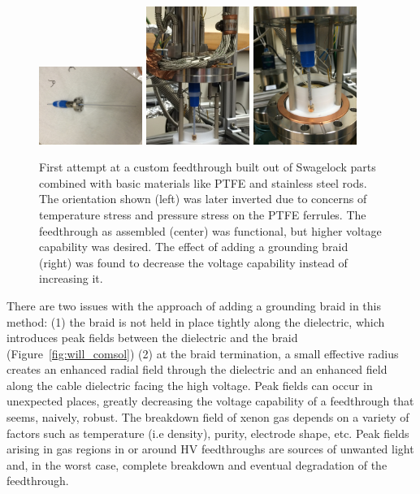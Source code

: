 \begin{figure}[htbp]
\begin{center}
\includegraphics[width=0.3\textwidth, angle=-90]{figures/testbed/ft4_1.jpg}
\includegraphics[width=0.3\textwidth, angle=-90]{figures/testbed/ft4_2.jpg}
\includegraphics[width=0.3\textwidth, angle=-90]{figures/testbed/ft4_3.jpg}

\caption{First attempt at a custom feedthrough built out of Swagelock parts combined with basic materials like \acs{PTFE} and stainless steel rods. The orientation shown (left) was later inverted due to concerns of temperature stress and pressure stress on the \acs{PTFE} ferrules. The feedthrough as assembled (center) was functional, but higher voltage capability was desired. The effect of adding a grounding braid (right) was found to decrease the voltage capability instead of increasing it.  }
\label{fig:ft4}
\end{center}
\end{figure}


There are two issues with the approach of adding a grounding braid in this method: (1) the braid is not held in place tightly along the dielectric, which introduces peak fields between the dielectric and the braid (Figure~\ref{fig:will_comsol}) (2) at the braid termination, a small effective radius creates an enhanced radial field through the  dielectric and an enhanced field along the cable dielectric facing the high voltage. Peak fields can occur in unexpected places, greatly decreasing the voltage capability of a feedthrough that seems, naively, robust. The breakdown field of xenon gas depends on a variety of factors such as temperature (i.e density), purity, electrode shape, etc. Peak fields arising in gas regions in or around \ac{HV} feedthroughs are sources of unwanted light and, in the worst case, complete breakdown and eventual degradation of the feedthrough. 

